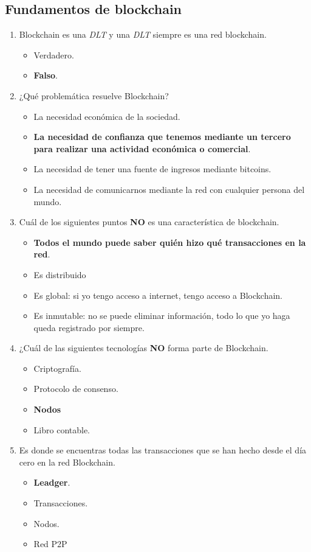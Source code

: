 \documentclass[a4paper,12pt]{lib/pub}
\begin{document}
\subsection{Fundamentos de blockchain}
\begin{enumerate}
	\item Blockchain es una \textit{DLT} y una \textit{DLT} siempre es una red blockchain.
	\begin{itemize}
		\item Verdadero.
		\item \textbf{Falso}.
	\end{itemize}
	\item ¿Qué problemática resuelve Blockchain?
	\begin{itemize}
		\item La necesidad económica de la sociedad.
		\item \textbf{La necesidad de confianza que tenemos mediante un tercero para realizar una actividad económica o comercial}.
		\item La necesidad de tener una fuente de ingresos mediante bitcoins.
		\item La necesidad de comunicarnos mediante la red con cualquier persona del mundo.
	\end{itemize}
	\item Cuál de los siguientes puntos \textbf{NO} es una característica de blockchain.
	\begin{itemize}
		\item \textbf{Todos el mundo puede saber quién hizo qué transacciones en la red}.
		\item Es distribuido
		\item Es global: si yo tengo acceso a internet, tengo acceso a Blockchain.
		\item Es inmutable: no se puede eliminar información, todo lo que yo haga queda registrado por siempre.
	\end{itemize}
	\item ¿Cuál de las siguientes tecnologías \textbf{NO} forma parte de Blockchain.
	\begin{itemize}
		\item Criptografía.
		\item Protocolo de consenso.
		\item \textbf{Nodos}
		\item Libro contable.
	\end{itemize}
	\item Es donde se encuentras todas las transacciones que se han hecho desde el día cero en la red Blockchain.
	\begin{itemize}
		\item \textbf{Leadger}.
		\item Transacciones.
		\item Nodos.
		\item Red P2P
	\end{itemize}
\end{enumerate}
\end{document}
